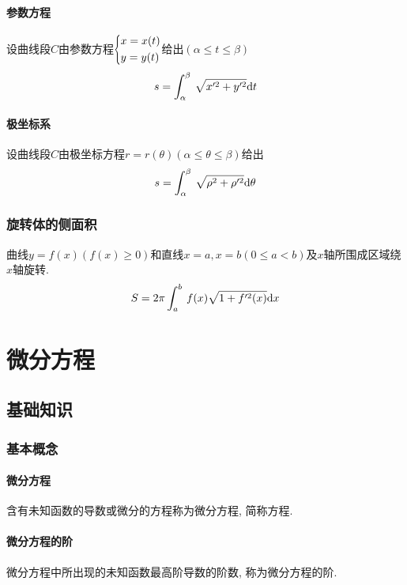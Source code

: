 \subsubsection{参数方程}
设曲线段$ C $由参数方程$
\scaleleftright[6pt]{\biggl\{}{
\begin{aligned}
& x=x(t) \\
& y=y(t)
\end{aligned}
}{.} $给出$ (\alpha\le t\le \beta) $
\begin{equation*}
s=\displaystyle\int_{\alpha}^{\beta}\hspace{.2em}\sqrt{x'^{2}+y'^{2}}\mathrm{d}t
\end{equation*}
\subsubsection{极坐标系}
设曲线段$ C $由极坐标方程$ r=r(\theta)(\alpha\le \theta\le \beta) $给出
\begin{equation*}
s=\displaystyle\int_{\alpha}^{\beta}\hspace{.2em}\sqrt{\rho^{2}+\rho'^{2}}\mathrm{d}\theta
\end{equation*}
\subsection{旋转体的侧面积}
曲线$ y=f(x)(f(x)\ge 0) $和直线$ x=a, x=b(0\le a<b) $及$ x $轴所围成区域绕$ x $轴旋转.
\begin{equation*}
S=2\pi\displaystyle\int_{a}^{b}\hspace{.2em}f(x)\sqrt{1+f'^{2}(x)}\mathrm{d}x
\end{equation*}
\chapter{微分方程}
\section{基础知识}
\subsection{基本概念}
\subsubsection{微分方程}
含有未知函数的导数或微分的方程称为微分方程, 简称方程.
\subsubsection{微分方程的阶}
微分方程中所出现的未知函数最高阶导数的阶数, 称为微分方程的阶.
